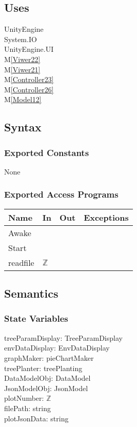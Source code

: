 \documentclass[12pt, titlepage]{article}
\newcommand{\mref}[1]{M\ref{#1}}
\begin{document}
\subsection{Uses}
UnityEngine\\
System.IO\\
UnityEngine.UI\\
\mref{Viwer22}\\
\mref{Viwer21}\\
\mref{Controller23}\\
\mref{Controller26}\\
\mref{Model12}
\subsection{Syntax}

\subsubsection{Exported Constants}
None

\subsubsection{Exported Access Programs}
\begin{center}
\begin{tabular}{|p{3cm}|p{4cm}|p{4cm}| p{5cm}|}
\hline
\textbf{Name} & \textbf{In} & \textbf{Out} & \textbf{Exceptions} \\
\hline
 Awake& &  & \\
\hline
 Start& &  & \\
\hline
 readfile& $\mathbb{Z}$ &  & \\
\hline
\end{tabular}
\end{center}

\subsection{Semantics}

\subsubsection{State Variables}
 treeParamDisplay: TreeParamDisplay\\
 envDataDisplay: EnvDataDisplay\\
 graphMaker: pieChartMaker\\
treePlanter: treePlanting\\
DataModelObj: DataModel\\
JsonModelObj: JsonModel\\
plotNumber: $\mathbb{Z}$\\
filePath: string\\
plotJsonData: string\\
\end{document}

